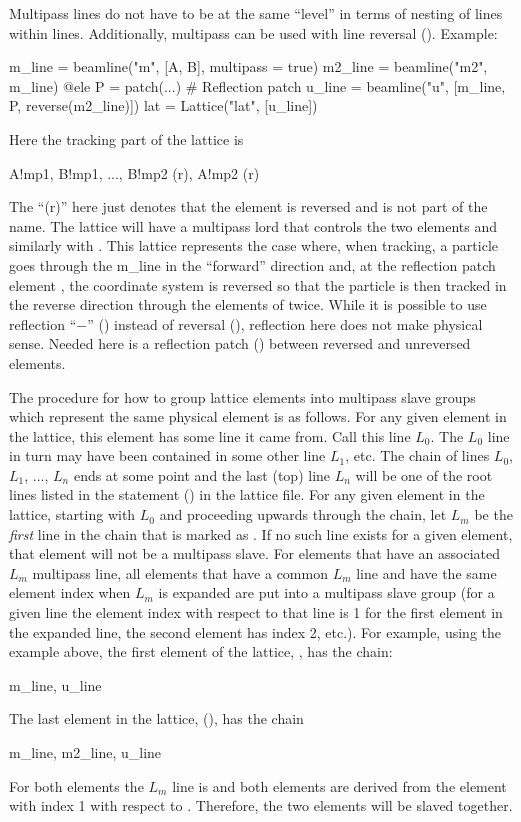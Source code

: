 Multipass lines do not have to be at the same ``level'' in terms of nesting of lines within
lines. Additionally, multipass can be used with line reversal (). Example:
\begin{example}
  m_line = beamline("m", [A, B], multipass = true)
  m2_line = beamline("m2", m_line)
  @ele P = patch(...)  # Reflection patch
  u_line = beamline("u", [m_line, P, reverse(m2_line)])
  lat = Lattice("lat", [u_line])
\end{example}
Here the tracking part of the lattice is
\begin{example}
  A!mp1, B!mp1, ..., B!mp2 (r), A!mp2 (r)
\end{example}
The ``(r)'' here just denotes that the element is reversed and is not part of the name. The lattice
will have a multipass lord  that controls the two  elements and similarly with
. This lattice represents the case where, when tracking, 
a particle goes through the m_line in the ``forward''
direction and, at the reflection patch element , the coordinate system is reversed so that the particle
is then tracked in the reverse direction through the elements of  twice.
While it is possible to use reflection ``$-$'' () instead
of reversal (), reflection here does not make physical sense.  Needed
here is a reflection patch  () between reversed and unreversed elements.

The procedure for how to group lattice elements into multipass slave groups which represent the same
physical element is as follows. For any given element in the lattice, this element has some line it
came from. Call this line $L_0$. The $L_0$ line in turn may have been contained in some other line
$L_1$, etc. The chain of lines $L_0$, $L_1$, ..., $L_n$ ends at some point and the last (top) line
$L_n$ will be one of the root lines listed in the  statement () in the lattice
file. For any given element in the lattice, starting with $L_0$ and proceeding upwards through the
chain, let $L_m$ be the {\em first} line in the chain that is marked as . If no such
line exists for a given element, that element will not be a multipass slave. For elements that have
an associated $L_m$ multipass line, all elements that have a common $L_m$ line and have the same
element index when $L_m$ is expanded are put into a multipass slave group (for a given line the
element index with respect to that line is 1 for the first element in the expanded line, the second
element has index 2, etc.).  For example, using the example above, the first element of the lattice,
, has the chain:
\begin{example}
    m_line, u_line
\end{example} 
The last element in the lattice, (), has the chain
\begin{example}
  m_line, m2_line, u_line
\end{example}
For both elements the $L_m$ line is  and both elements are derived from the element with
index 1 with respect to . Therefore, the two elements will be slaved together.


